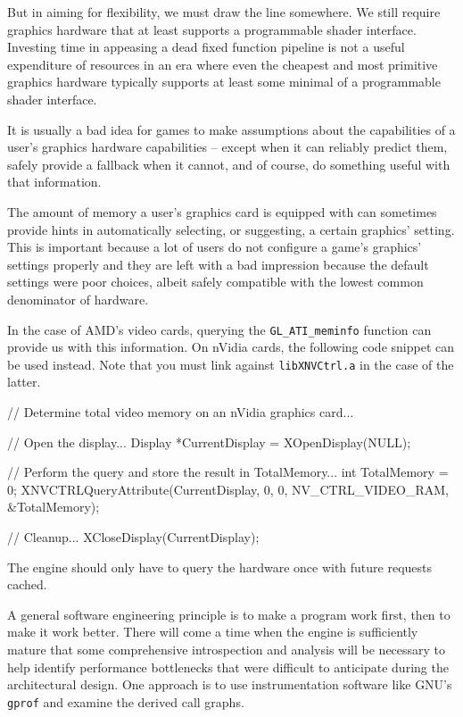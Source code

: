But in aiming for flexibility, we must draw the line somewhere. We still require graphics hardware that at least supports a programmable shader interface. Investing time in appeasing a dead fixed function pipeline is not a useful expenditure of resources in an era where even the cheapest and most primitive graphics hardware typically supports at least some minimal of a programmable shader interface.

It is usually a bad idea for games to make assumptions about the capabilities of a user's graphics hardware capabilities -- except when it can reliably predict them, safely provide a fallback when it cannot, and of course, do something useful with that information. 

The amount of memory a user's graphics card is equipped with can sometimes provide hints in automatically selecting, or suggesting, a certain graphics' setting. This is important because a lot of users do not configure a game's graphics' settings properly and they are left with a bad impression because the default settings were poor choices, albeit safely compatible with the lowest common denominator of hardware.

In the case of AMD's video cards, querying the {\tt GL_ATI_meminfo} function can provide us with this information. On nVidia cards, the following code snippet can be used instead. Note that you must link against {\tt libXNVCtrl.a} in the case of the latter.

\startCodeExample
// Determine total video memory on an nVidia graphics card...

    // Open the display...
    Display *CurrentDisplay = XOpenDisplay(NULL);

    // Perform the query and store the result in TotalMemory...
    int TotalMemory = 0;
    XNVCTRLQueryAttribute(CurrentDisplay, 0, 0, NV_CTRL_VIDEO_RAM, &TotalMemory);
    
    // Cleanup...
    XCloseDisplay(CurrentDisplay);
\stopCodeExample

The engine should only have to query the hardware once with future requests cached.

A general software engineering principle is to make a program work first, then to make it work better. There will come a time when the engine is sufficiently mature that some comprehensive introspection and analysis will be necessary to help identify performance bottlenecks that were difficult to anticipate during the architectural design. One approach is to use instrumentation software like GNU's {\tt gprof} and examine the derived call graphs.

